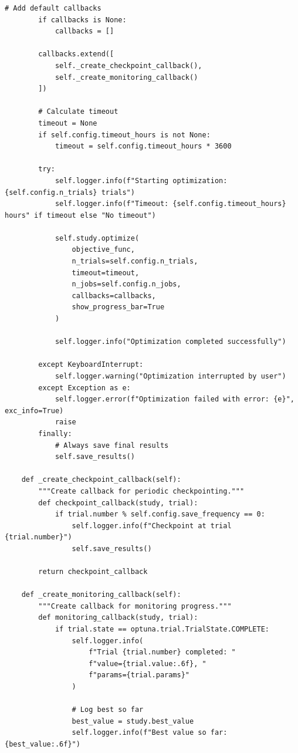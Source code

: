 \begin{lstlisting}[style=python, caption=Production-grade automated HPO pipeline]
        # Add default callbacks
        if callbacks is None:
            callbacks = []

        callbacks.extend([
            self._create_checkpoint_callback(),
            self._create_monitoring_callback()
        ])

        # Calculate timeout
        timeout = None
        if self.config.timeout_hours is not None:
            timeout = self.config.timeout_hours * 3600

        try:
            self.logger.info(f"Starting optimization: {self.config.n_trials} trials")
            self.logger.info(f"Timeout: {self.config.timeout_hours} hours" if timeout else "No timeout")

            self.study.optimize(
                objective_func,
                n_trials=self.config.n_trials,
                timeout=timeout,
                n_jobs=self.config.n_jobs,
                callbacks=callbacks,
                show_progress_bar=True
            )

            self.logger.info("Optimization completed successfully")

        except KeyboardInterrupt:
            self.logger.warning("Optimization interrupted by user")
        except Exception as e:
            self.logger.error(f"Optimization failed with error: {e}", exc_info=True)
            raise
        finally:
            # Always save final results
            self.save_results()

    def _create_checkpoint_callback(self):
        """Create callback for periodic checkpointing."""
        def checkpoint_callback(study, trial):
            if trial.number % self.config.save_frequency == 0:
                self.logger.info(f"Checkpoint at trial {trial.number}")
                self.save_results()

        return checkpoint_callback

    def _create_monitoring_callback(self):
        """Create callback for monitoring progress."""
        def monitoring_callback(study, trial):
            if trial.state == optuna.trial.TrialState.COMPLETE:
                self.logger.info(
                    f"Trial {trial.number} completed: "
                    f"value={trial.value:.6f}, "
                    f"params={trial.params}"
                )

                # Log best so far
                best_value = study.best_value
                self.logger.info(f"Best value so far: {best_value:.6f}")


\end{lstlisting}
